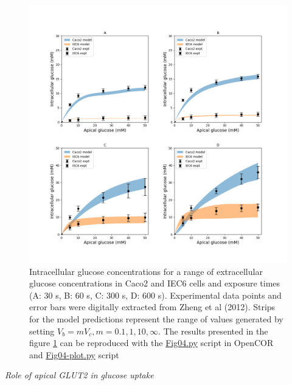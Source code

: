 \documentclass[fleqn,10pt]{physiome}
\begin{document}
\begin{figure}[ht]
\centering
\includegraphics[width=0.9\linewidth]{fig04.png}
\caption{Intracellular glucose concentrations for a range of extracellular glucose concentrations in Caco2 and IEC6 cells and exposure times (A: 30 s, B: 60 s, C: 300 s, D: 600 s). Experimental data points and error bars were digitally extracted from Zheng et al (2012). Strips for the model predictions represent the range of values generated by setting $V_b = m V_c, m = 0.1, 1, 10, \infty$. The results presented in the figure \ref{fig04} can be reproduced with the \href{https://models.physiomeproject.org/workspace/572/file/c052b0c460280139dad150937fbee4fa6a026505/SEDML_files/Fig04.py}{Fig04.py} script in OpenCOR and \href{https://models.physiomeproject.org/workspace/572/file/c052b0c460280139dad150937fbee4fa6a026505/SEDML_files/Fig04_plot.py}{Fig04-plot.py} script}
\label{fig04}
\end{figure}\newline

\textit{Role of apical GLUT2 in glucose uptake}\newline
\end{document}
